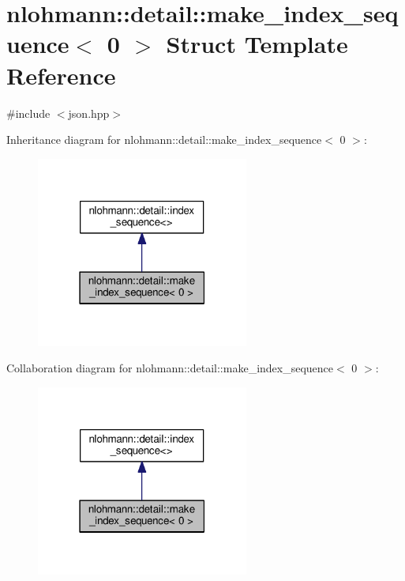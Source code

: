 \hypertarget{structnlohmann_1_1detail_1_1make__index__sequence_3_010_01_4}{}\section{nlohmann\+:\+:detail\+:\+:make\+\_\+index\+\_\+sequence$<$ 0 $>$ Struct Template Reference}
\label{structnlohmann_1_1detail_1_1make__index__sequence_3_010_01_4}


{\ttfamily \#include $<$json.\+hpp$>$}



Inheritance diagram for nlohmann\+:\+:detail\+:\+:make\+\_\+index\+\_\+sequence$<$ 0 $>$\+:\nopagebreak
\begin{figure}[H]
\begin{center}
\leavevmode
\includegraphics[width=198pt]{structnlohmann_1_1detail_1_1make__index__sequence_3_010_01_4__inherit__graph}
\end{center}
\end{figure}


Collaboration diagram for nlohmann\+:\+:detail\+:\+:make\+\_\+index\+\_\+sequence$<$ 0 $>$\+:\nopagebreak
\begin{figure}[H]
\begin{center}
\leavevmode
\includegraphics[width=198pt]{structnlohmann_1_1detail_1_1make__index__sequence_3_010_01_4__coll__graph}
\end{center}
\end{figure}
